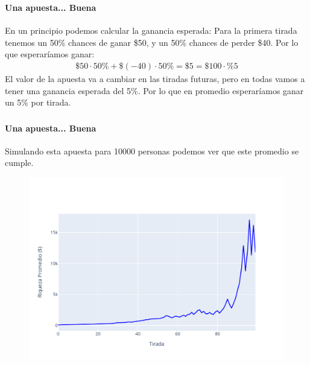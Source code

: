 \documentclass{beamer}
\begin{document}
\begin{frame}
  \frametitle{\SECTIONC}
  \framesubtitle{Una apuesta... Buena}

  En un principio podemos calcular la ganancia esperada: Para la primera tirada tenemos un 50\% chances de ganar \$50, y un 50\% chances de perder \$40. Por lo que esperaríamos ganar:
  \begin{gather*}
    \$50 \cdot 50\% + \$(-40) \cdot 50\% = \$5 = \$100 \cdot \%5
  \end{gather*}
  \pause El valor de la apuesta va a cambiar en las tiradas futuras, pero en todas vamos a tener una ganancia esperada del 5\%. Por lo que en promedio esperaríamos ganar un 5\% por tirada.
\end{frame}

\begin{frame}
  \frametitle{\SECTIONC}
  \framesubtitle{Una apuesta... Buena}

  Simulando esta apuesta para 10000 personas podemos ver que este promedio se cumple.

  \begin{figure}[H]
    \centering
    \includegraphics[scale=0.5]{img/mean.pdf}
  \end{figure}
\end{frame}
\end{document}
